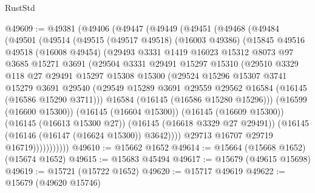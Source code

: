 \begin{lexlean}{RustStd}
\begin{coremodule}
@49609 := @49381
    (@49406
      (@49447
        (@49449
          (@49451
            (@49468
              (@49484
                (@49501
                  (@49514
                    (@49515
                      (@49517 @49518)
                      (@16003 @49386)
                      (@15845
                        @49516
                        @49518
                        (@16008 @49454)
                        (@29493
                          @3331
                          @1419
                          @16023
                          @15312
                          @8073
                          @97
                          @3685
                          @15271
                          @3691
                          (@29504
                            @3331
                            @29491
                            @15297
                            @15310
                            (@29510
                              @3329
                              @118
                              @27
                              @29491
                              @15297
                              @15308
                              @15300
                              (@29524
                                @15296
                                @15307
                                @3741
                                @15279
                                @3691
                                @29540
                                (@29549
                                  @15289
                                  @3691
                                  @29559
                                  @29562
                                  @16584
                                  (@16145 (@16586 @15290 @3711)))
                                @16584
                                (@16145 (@16586 @15280 @15296)))
                              (@16599 (@16600 @15300))
                              (@16145 (@16604 @15300))
                              (@16145 (@16609 @15300))
                              (@16145 (@16613 @15300 @27))
                              (@16145 (@16618 @3329 @27 @29491))
                              (@16145 (@16146 (@16147 (@16624 @15300)) @3642))))
                          @29713
                          @16707
                          @29719
                          @16719)))))))))))
@49610 := @15662 @1652
@49614 := @15664 (@15668 @1652) (@15674 @1652)
@49615 := @15683 @45494
@49617 := @15679 (@49615 @15698)
@49619 := @15721 (@15722 @1652)
@49620 := @15717 @49619
@49622 := @15679 (@49620 @15746)

\end{coremodule}
\end{lexlean}
